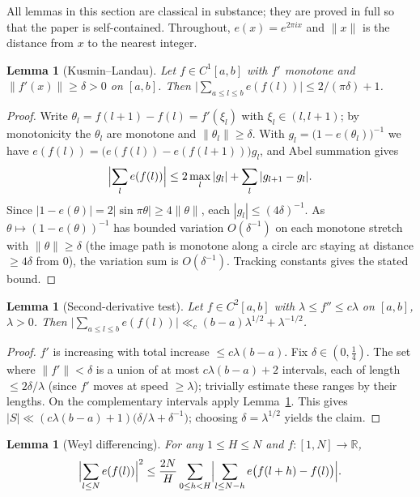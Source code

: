 \documentclass[11pt]{article}
\newtheorem{lemma}[theorem]{Lemma}
\theoremstyle{definition}
\theoremstyle{plain}
\begin{document}
All lemmas in this section are classical in substance; they are proved in
full so that the paper is self-contained.  Throughout, $e(x)=e^{2\pi ix}$
and $\|x\|$ is the distance from $x$ to the nearest integer.

\begin{lemma}[Kusmin--Landau]\label{lem:KL}
Let $f\in C^1[a,b]$ with $f'$ monotone and $\|f'(x)\|\ge\delta>0$ on
$[a,b]$.  Then $\bigl|\sum_{a\le l\le b}e(f(l))\bigr|\le 2/(\pi\delta)+1$.
\end{lemma}

\begin{proof}
Write $\theta_l=f(l+1)-f(l)=f'(\xi_l)$ with $\xi_l\in(l,l+1)$; by
monotonicity the $\theta_l$ are monotone and $\|\theta_l\|\ge\delta$.
With $g_l=\bigl(1-e(\theta_l)\bigr)^{-1}$ we have
$e(f(l))=\bigl(e(f(l))-e(f(l+1))\bigr)g_l$, and Abel summation gives
\[
\Bigl|\sum_l e(f(l))\Bigr|
\le 2\max_l|g_l|+\sum_l|g_{l+1}-g_l| .
\]
Since $|1-e(\theta)|=2|\sin\pi\theta|\ge4\|\theta\|$, each
$|g_l|\le(4\delta)^{-1}$.  As $\theta\mapsto(1-e(\theta))^{-1}$ has
bounded variation $O(\delta^{-1})$ on each monotone stretch with
$\|\theta\|\ge\delta$ (the image path is monotone along a circle arc
staying at distance $\ge4\delta$ from $0$), the variation sum is
$O(\delta^{-1})$.  Tracking constants gives the stated bound.
\end{proof}

\begin{lemma}[Second-derivative test]\label{lem:vdc2}
Let $f\in C^2[a,b]$ with $\lambda\le f''\le c\lambda$ on $[a,b]$,
$\lambda>0$.  Then
$\bigl|\sum_{a\le l\le b}e(f(l))\bigr|
\ll_c (b-a)\lambda^{1/2}+\lambda^{-1/2}$.
\end{lemma}

\begin{proof}
$f'$ is increasing with total increase $\le c\lambda(b-a)$.  Fix
$\delta\in(0,\tfrac14)$.  The set where $\|f'\|<\delta$ is a union of at
most $c\lambda(b-a)+2$ intervals, each of length $\le2\delta/\lambda$
(since $f'$ moves at speed $\ge\lambda$); trivially estimate these ranges
by their lengths.  On the complementary intervals apply
Lemma~\ref{lem:KL}.  This gives
$|S|\ll(c\lambda(b-a)+1)\bigl(\delta/\lambda+\delta^{-1}\bigr)$;
choosing $\delta=\lambda^{1/2}$ yields the claim.
\end{proof}

\begin{lemma}[Weyl differencing]\label{lem:weyl}
For any $1\le H\le N$ and $f:[1,N]\to\mathbb R$,
\[
\Bigl|\sum_{l\le N}e(f(l))\Bigr|^2
\le\frac{2N}{H}\sum_{0\le h<H}
\Bigl|\sum_{l\le N-h}e\bigl(f(l+h)-f(l)\bigr)\Bigr| .
\]
\end{lemma}
\end{document}
